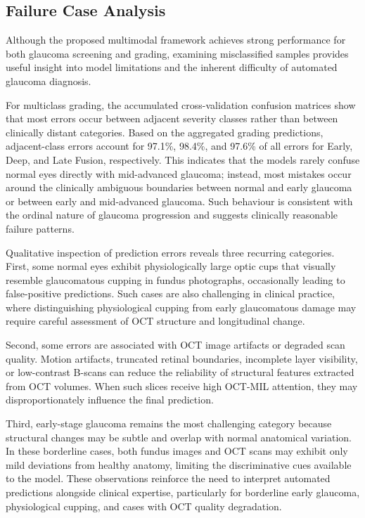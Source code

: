 \documentclass[preprint,12pt]{elsarticle}
\begin{document}
\subsection{Failure Case Analysis}
\label{subsec:failure_analysis}

Although the proposed multimodal framework achieves strong performance for both glaucoma screening and grading, examining misclassified samples provides useful insight into model limitations and the inherent difficulty of automated glaucoma diagnosis.

For multiclass grading, the accumulated cross-validation confusion matrices show that most errors occur between adjacent severity classes rather than between clinically distant categories. Based on the aggregated grading predictions, adjacent-class errors account for 97.1\%, 98.4\%, and 97.6\% of all errors for Early, Deep, and Late Fusion, respectively. This indicates that the models rarely confuse normal eyes directly with mid-advanced glaucoma; instead, most mistakes occur around the clinically ambiguous boundaries between normal and early glaucoma or between early and mid-advanced glaucoma. Such behaviour is consistent with the ordinal nature of glaucoma progression and suggests clinically reasonable failure patterns.

Qualitative inspection of prediction errors reveals three recurring categories. First, some normal eyes exhibit physiologically large optic cups that visually resemble glaucomatous cupping in fundus photographs, occasionally leading to false-positive predictions. Such cases are also challenging in clinical practice, where distinguishing physiological cupping from early glaucomatous damage may require careful assessment of OCT structure and longitudinal change.

Second, some errors are associated with OCT image artifacts or degraded scan quality. Motion artifacts, truncated retinal boundaries, incomplete layer visibility, or low-contrast B-scans can reduce the reliability of structural features extracted from OCT volumes. When such slices receive high OCT-MIL attention, they may disproportionately influence the final prediction.

Third, early-stage glaucoma remains the most challenging category because structural changes may be subtle and overlap with normal anatomical variation. In these borderline cases, both fundus images and OCT scans may exhibit only mild deviations from healthy anatomy, limiting the discriminative cues available to the model. These observations reinforce the need to interpret automated predictions alongside clinical expertise, particularly for borderline early glaucoma, physiological cupping, and cases with OCT quality degradation.
\end{document}
